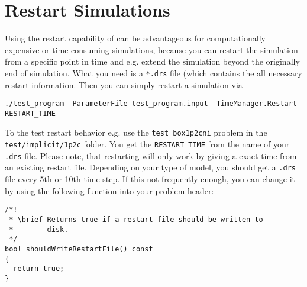 \section{Restart \Dumux Simulations}
\label{sec:restartSimulations}
Using the restart capability of \Dumux can be advantageous for computationally
expensive or time consuming simulations, because you can restart the simulation
from a specific point in time and e.g. extend the simulation beyond the originally
end of simulation. What you need is a \texttt{*.drs} file (which contains the
all necessary restart information.
Then you can simply restart a simulation via
\begin{lstlisting}[style=Bash]
./test_program -ParameterFile test_program.input -TimeManager.Restart RESTART_TIME
\end{lstlisting}
To the test restart behavior e.g. use the \texttt{test\_box1p2cni} problem
in the \texttt{test/implicit/1p2c} folder.
You get the \texttt{RESTART\_TIME} from the name of your \texttt{.drs} file.
Please note, that restarting will only work by giving a exact time from
an existing restart file.
Depending on your type of model, you should get a \texttt{.drs} file every
5th or 10th time step. If this not frequently enough, you can change it
by using the following function into your problem header:
\begin{lstlisting}[style=DumuxCode]
/*!
 * \brief Returns true if a restart file should be written to
 *        disk.
 */
bool shouldWriteRestartFile() const
{
  return true;
}
\end{lstlisting}

